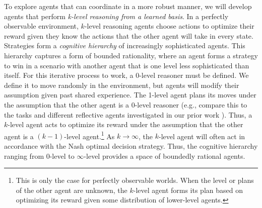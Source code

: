 \documentclass[12pt]{article}
\begin{document}
To explore agents that can coordinate in a more robust manner, we will
develop agents that perform \emph{k-level reasoning from a learned
  basis}.  In a perfectly observable environment, $k$-level reasoning
agents choose actions to optimize their reward given they know the
actions that the other agent will take in every state.
Strategies form a \emph{cognitive hierarchy} of increasingly
sophisticated agents.  This hierarchy captures a form of bounded
rationality, where an agent forms a strategy to win in a scenario with
another agent that is one level less sophisticated than itself. For
this iterative process to work, a 0-level reasoner must be defined.
We define it to move randomly in the environment, but agents will
modify their assumption given past shared experience.  The 1-level
agent plans its moves under the assumption that the other agent is a
0-level reasoner (e.g., compare this to the tasks and different
reflective agents investigated in our prior work
\citep{schermerhornscheutz07adaptivebehavior}).  
Thus, a $k$-level agent acts to optimize its reward under the
assumption that the other agent is a $(k-1)$-level
agent.\footnote{This is only the case for perfectly observable
  worlds. When the level or plans of the other agent are unknown, the
  $k$-level agent forms its plan based on optimizing its reward given
  some distribution of lower-level agents.} As $k \rightarrow \infty$,
the $k$-level agent will often act in accordance with the Nash optimal
decision strategy. Thus, the cognitive hierarchy ranging from 0-level
to $\infty$-level provides a space of boundedly rational agents.


\end{document}
